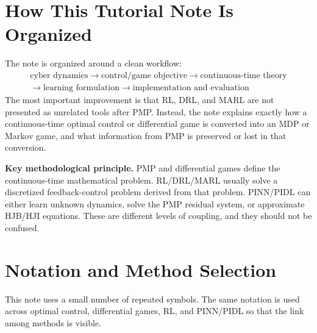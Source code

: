 \documentclass[11pt,a4paper]{article}
\begin{document}
\tableofcontents
\newpage
{}
\section{How This Tutorial Note Is Organized}
The note is organized around a clean workflow:
\begin{equation}
\begin{array}{c}
\boxed{\text{cyber dynamics}}\rightarrow\boxed{\text{control/game objective}}\rightarrow\boxed{\text{continuous-time theory}}\\[0.4em]
\rightarrow\boxed{\text{learning formulation}}\rightarrow\boxed{\text{implementation and evaluation}}
\end{array}
\end{equation}
The most important improvement is that RL, DRL, and MARL are not presented as unrelated tools after PMP. Instead, the note explains exactly how a continuous-time optimal control or differential game is converted into an MDP or Markov game, and what information from PMP is preserved or lost in that conversion.

\begin{boxednote}
\textbf{Key methodological principle.}
PMP and differential games define the continuous-time mathematical problem. RL/DRL/MARL usually solve a discretized feedback-control problem derived from that problem. PINN/PIDL can either learn unknown dynamics, solve the PMP residual system, or approximate HJB/HJI equations. These are different levels of coupling, and they should not be confused.
\end{boxednote}



\section{Notation and Method Selection}
This note uses a small number of repeated symbols. The same notation is used across optimal control, differential games, RL, and PINN/PIDL so that the link among methods is visible.
\end{document}
